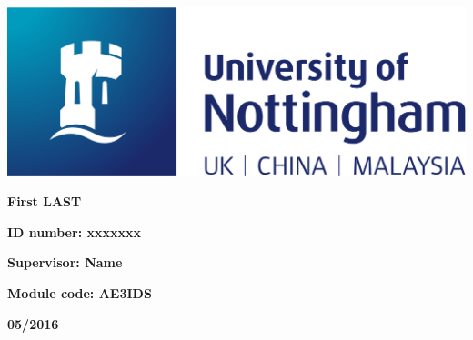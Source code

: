\documentclass[a4paper]{article}
\begin{document}
  
  \vskip 1.5in \par 
  \begin{center}
    \includegraphics[width=0.8\columnwidth]{nottingham-logo.png} \par

    \vskip 1.5in \par 
    \Huge {\bf First LAST}
  \end{center}
  

  \vskip 1in \par
  \huge {\bf ID number: xxxxxxx}
  \vskip 0.5in \par
  \huge {\bf Supervisor: Name}
  \vskip 0.5in \par
  \huge {\bf Module code: AE3IDS}
  \vskip 1in \par
  \centering \huge {\bf 05/2016}
\end{document}
